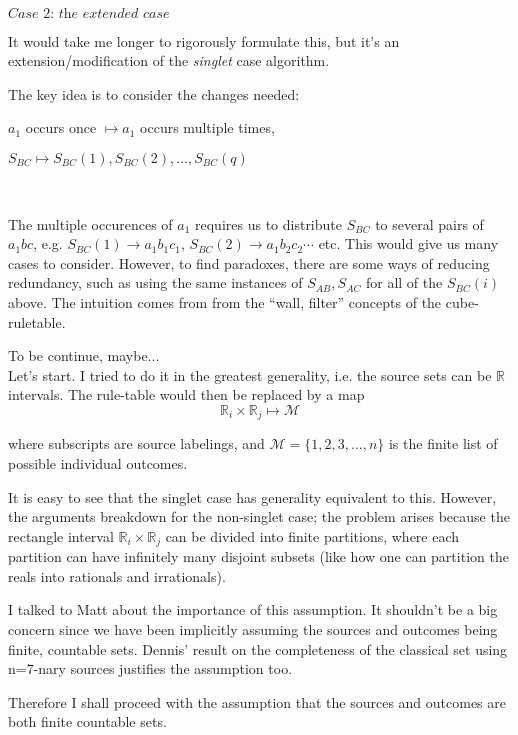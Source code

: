 \documentclass[12pt]{article}  %
\begin{document}
\begin{enumerate}
\begin{enumerate}
\end{enumerate}
\



$\textit{Case 2: the extended case}$


It would take me longer to rigorously formulate this, but it's an extension/modification of the \textit{singlet} case algorithm.

The key idea is to consider the changes needed:\\


\centerline{$a_1$ occurs once $\mapsto a_1$ occurs multiple times,}
\centerline{$S_{BC} \mapsto S_{BC}(1),S_{BC}(2),\dots,S_{BC}(q)$}

\


The multiple occurences of $a_1$ requires us to distribute $S_{BC}$ to several pairs of $a_1bc$, e.g. $S_{BC}(1) \rightarrow a_1b_1c_1$, $S_{BC}(2) \rightarrow a_1b_2c_2 \cdots$ etc. This would give us many cases to consider. However, to find paradoxes, there are some ways of reducing redundancy, such as using the same instances of $S_{AB},S_{AC}$ for all of the $S_{BC}(i)$ above. The intuition comes from from the ``wall, filter'' concepts of the cube-ruletable.


To be continue, maybe...\\


Let's start. I tried to do it in the greatest generality, i.e. the source sets can be $\mathbb{R}$ intervals. The rule-table would then be replaced by a map $$\mathbb{R}_i \times \mathbb{R}_j \mapsto \mathcal{M}$$

where subscripts are source labelings, and $\mathcal{M}=\{1,2,3, \dots, n \}$ is the finite list of possible individual outcomes.


It is easy to see that the singlet case has generality equivalent to this. However, the arguments breakdown for the non-singlet case; the problem arises because the rectangle interval $\mathbb{R}_i \times \mathbb{R}_j$ can be divided into finite partitions, where each partition can have infinitely many disjoint subsets (like how one can partition the reals into rationals and irrationals).


I talked to Matt about the importance of this assumption. It shouldn't be a big concern since we have been implicitly assuming the sources and outcomes being finite, countable sets. Dennis' result on the completeness of the classical set using n=7-nary sources justifies the assumption too.


Therefore I shall proceed with the assumption that the sources and outcomes are both finite countable sets.



\end{enumerate}
\end{document}
